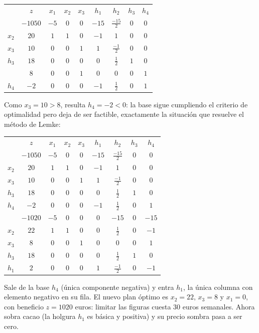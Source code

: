 \begin{enumerate}
\begin{center}
\begin{tabular}{c|c|ccccccc|}
  & $z$ & $x_1$ & $x_2$ & $x_3$ & $h_1$ & $h_2$ & $h_3$ & $h_4$\\
 & $-1050$ & $-5$ & $0$ & $0$ & $-15$ & $\frac{-15}{2}$ & $0$ & $0$\\
\hline
$x_2$ & $20$ & $1$ & $1$ & $0$ & $-1$ & $1$ & $0$ & $0$\\
$x_3$ & $10$ & $0$ & $0$ & $1$ & $1$ & $\frac{-1}{2}$ & $0$ & $0$\\
$h_3$ & $18$ & $0$ & $0$ & $0$ & $0$ & $\frac{1}{2}$ & $1$ & $0$\\
\hline
 & $8$ & $0$ & $0$ & $1$ & $0$ & $0$ & $0$ & $1$\\
\hline
$h_4$ & $-2$ & $0$ & $0$ & $0$ & $-1$ & $\frac{1}{2}$ & $0$ & $1$\\
\hline
\end{tabular}
\end{center}

Como $x_3 = 10 > 8$, resulta $h_4 = -2 < 0$: la base sigue cumpliendo el criterio de optimalidad pero deja de ser factible, exactamente la situación que resuelve el método de Lemke:

\begin{center}
\begin{tabular}{c|c|ccccccc|}
  & $z$ & $x_1$ & $x_2$ & $x_3$ & $h_1$ & $h_2$ & $h_3$ & $h_4$\\
 & $-1050$ & $-5$ & $0$ & $0$ & $-15$ & $\frac{-15}{2}$ & $0$ & $0$\\
\hline
$x_2$ & $20$ & $1$ & $1$ & $0$ & $-1$ & $1$ & $0$ & $0$\\
$x_3$ & $10$ & $0$ & $0$ & $1$ & $1$ & $\frac{-1}{2}$ & $0$ & $0$\\
$h_3$ & $18$ & $0$ & $0$ & $0$ & $0$ & $\frac{1}{2}$ & $1$ & $0$\\
$h_4$ & $-2$ & $0$ & $0$ & $0$ & $-1$ & $\frac{1}{2}$ & $0$ & $1$\\
\hline
 & $-1020$ & $-5$ & $0$ & $0$ & $0$ & $-15$ & $0$ & $-15$\\
\hline
$x_2$ & $22$ & $1$ & $1$ & $0$ & $0$ & $\frac{1}{2}$ & $0$ & $-1$\\
$x_3$ & $8$ & $0$ & $0$ & $1$ & $0$ & $0$ & $0$ & $1$\\
$h_3$ & $18$ & $0$ & $0$ & $0$ & $0$ & $\frac{1}{2}$ & $1$ & $0$\\
$h_1$ & $2$ & $0$ & $0$ & $0$ & $1$ & $\frac{-1}{2}$ & $0$ & $-1$\\
\hline
\end{tabular}
\end{center}

Sale de la base $h_4$ (única componente negativa) y entra $h_1$, la única columna con elemento negativo en su fila. El nuevo plan óptimo es $x_2 = 22$, $x_3 = 8$ y $x_1 = 0$, con beneficio $z = 1020$ euros: limitar las figuras cuesta 30 euros semanales. Ahora sobra cacao (la holgura $h_1$ es básica y positiva) y su precio sombra pasa a ser cero.

\end{enumerate}
